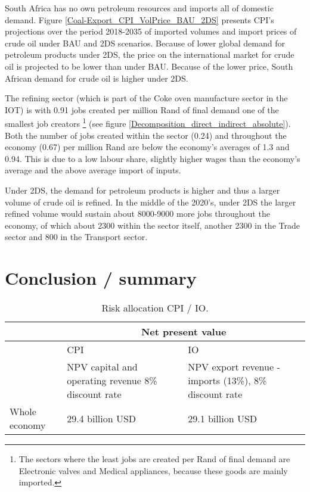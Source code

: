 \documentclass[12pt,english]{article}
\begin{document}
South Africa has no own petroleum resources and imports all of domestic demand. Figure \ref{Coal-Export_CPI_VolPrice_BAU_2DS} presents CPI's projections over the period 2018-2035 of imported volumes and import prices of crude oil under BAU and 2DS scenarios. Because of lower global demand for petroleum products under 2DS, the price on the international market for crude oil is projected to be lower than under BAU. Because of the lower price, South African demand for crude oil is higher under 2DS. 

The refining sector (which is part of the Coke oven manufacture sector in the IOT) is with 0.91 jobs created per million Rand of final demand one of the smallest job creators \footnote{The sectors where the least jobs are created per Rand of final demand are Electronic valves and Medical appliances, because these goods are mainly imported.} (see figure \ref{Decomposition_direct_indirect_absolute}). Both the number of jobs created within the sector (0.24) and throughout the economy (0.67) per million Rand are below the economy's averages of 1.3 and 0.94. This is due to a low labour share, slightly higher wages than the economy's average and the above average import of inputs. 

Under 2DS, the demand for petroleum products is higher and thus a larger volume of crude oil is refined. In the middle of the 2020's, under 2DS the larger refined volume would sustain about 8000-9000 more jobs throughout the economy, of which about 2300 within the sector itself, another 2300 in the Trade sector and 800 in the Transport sector.



\section{Conclusion / summary}

\begin{table}[!t]
	\centering
	\begin{tabular}{lp{180pt}p{180pt}}
		\toprule
	 &\multicolumn{2}{c}{Net present value} \\	
	 \midrule													
	& CPI & IO \\	
& NPV capital and operating revenue 8\% discount rate& NPV export revenue - imports (13\%), 8\% discount rate \\														

	 \midrule													
Whole economy	& 29.4 billion USD & 29.1 billion USD \\	
		\bottomrule
	\end{tabular}
	\caption{\label{External risk}Risk allocation CPI / IO.}
\end{table}
\end{document}
